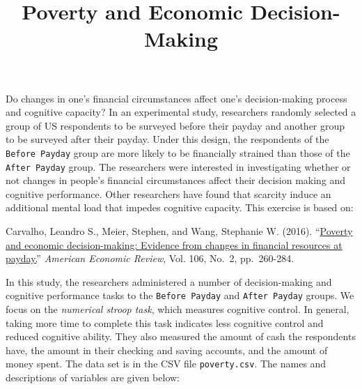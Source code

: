 \documentclass[
]{article}
\title{Poverty and Economic Decision-Making}
\author{}
\date{\vspace{-2.5em}}
\begin{document}
\maketitle

Do changes in one's financial circumstances affect one's decision-making
process and cognitive capacity? In an experimental study, researchers
randomly selected a group of US respondents to be surveyed before their
payday and another group to be surveyed after their payday. Under this
design, the respondents of the \texttt{Before\ Payday} group are more
likely to be financially strained than those of the
\texttt{After\ Payday} group. The researchers were interested in
investigating whether or not changes in people's financial circumstances
affect their decision making and cognitive performance. Other
researchers have found that scarcity induce an additional mental load
that impedes cognitive capacity. This exercise is based on:

Carvalho, Leandro S., Meier, Stephen, and Wang, Stephanie W. (2016).
``\href{http://dx.doi.org/10.1257/aer.20140481}{Poverty and economic
decision-making: Evidence from changes in financial resources at
payday.}'' \emph{American Economic Review}, Vol. 106, No.~2,
pp.~260-284.

In this study, the researchers administered a number of decision-making
and cognitive performance tasks to the \texttt{Before\ Payday} and
\texttt{After\ Payday} groups. We focus on the \emph{numerical stroop
task}, which measures cognitive control. In general, taking more time to
complete this task indicates less cognitive control and reduced
cognitive ability. They also measured the amount of cash the respondents
have, the amount in their checking and saving accounts, and the amount
of money spent. The data set is in the CSV file \texttt{poverty.csv}.
The names and descriptions of variables are given below:
\end{document}
